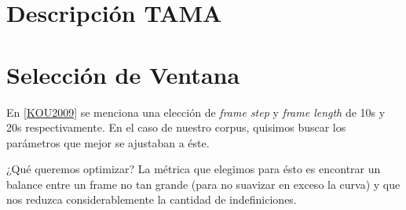 \section{Descripción TAMA}

\section{Selección de Ventana}

En \ref{KOU2009} se menciona una elección de \emph{frame step} y \emph{frame length} de 10s y 20s respectivamente. En el caso de nuestro corpus, quisimos buscar los parámetros que mejor se ajustaban a éste.

¿Qué queremos optimizar? La métrica que elegimos para ésto es encontrar un balance entre un frame no tan grande (para no suavizar en exceso la curva) y que nos reduzca considerablemente la cantidad de indefiniciones.


